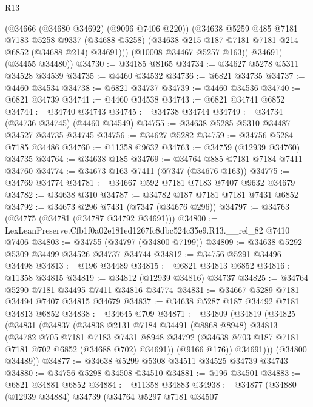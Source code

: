 \begin{lexlean}{R13}
\begin{coremodule}
            (@34666 (@34680 @34692) (@9096 @7406 @220))
            (@34638
              @5259
              @485
              @7181
              @7183
              @5258
              @9337
              (@34688 @5258)
              (@34638 @215 @187 @7181 @7181 @214 @6852 (@34688 @214) @34691)))
          (@10008 @34467 @5257 @163))
        @34691)
      (@34455 @34480))
@34730 := @34185 @8165
@34734 := @34627 @5278 @5311 @34528 @34539
@34735 := @4460 @34532
@34736 := @6821 @34735
@34737 := @4460 @34534
@34738 := @6821 @34737
@34739 := @4460 @34536
@34740 := @6821 @34739
@34741 := @4460 @34538
@34743 := @6821 @34741 @6852
@34744 := @34740 @34743
@34745 := @34738 @34744
@34749 := @34734 (@34736 @34745) (@4460 @34549)
@34755 := @34638 @5285 @5310 @34487 @34527 @34735 @34745
@34756 := @34627 @5282
@34759 := @34756 @5284 @7185 @34486
@34760 := @11358 @9632
@34763 := @34759 (@12939 @34760) @34735
@34764 := @34638 @185
@34769 := @34764 @885 @7181 @7184 @7411 @34760
@34774 := @34673 @163 @7411 (@7347 (@34676 @163))
@34775 := @34769 @34774
@34781 := @34667 @592 @7181 @7183 @7407 @9632 @34679
@34782 := @34638 @310
@34787 := @34782 @187 @7181 @7181 @7431 @6852
@34792 := @34673 @296 @7431 (@7347 (@34676 @296))
@34797 := @34763 (@34775 (@34781 (@34787 @34792 @34691)))
@34800 := LexLeanPreserve.Cfb1f0a02e181ed1267fc8dbc524c35e9.R13.__rel_82 @7410 @7406
@34803 := @34755 (@34797 (@34800 @7199))
@34809 := @34638 @5292 @5309 @34499 @34526 @34737 @34744
@34812 := @34756 @5291 @34496 @34498
@34813 := @196 @34489
@34815 := @6821 @34813 @6852
@34816 := @11358 @34815
@34819 := @34812 (@12939 @34816) @34737
@34825 := @34764 @5290 @7181 @34495 @7411 @34816 @34774
@34831 := @34667 @5289 @7181 @34494 @7407 @34815 @34679
@34837 := @34638 @5287 @187 @34492 @7181 @34813 @6852
@34838 := @34645 @709
@34871 := @34809
    (@34819
      (@34825
        (@34831
          (@34837
            (@34838
              @2131
              @7184
              @34491
              (@8868 @8948)
              @34813
              (@34782
                @705
                @7181
                @7183
                @7431
                @8948
                @34792
                (@34638 @703 @187 @7181 @7181 @702 @6852 (@34688 @702) @34691))
              (@9166 @176))
            @34691)))
      (@34800 @34489))
@34877 := @34638 @5299 @5308 @34511 @34525 @34739 @34743
@34880 := @34756 @5298 @34508 @34510
@34881 := @196 @34501
@34883 := @6821 @34881 @6852
@34884 := @11358 @34883
@34938 := @34877
    (@34880
      (@12939 @34884)
      @34739
      (@34764
        @5297
        @7181
        @34507

\end{coremodule}
\end{lexlean}
